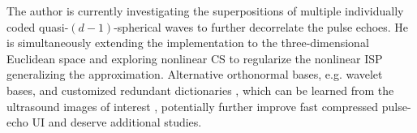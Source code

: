 The author is currently investigating
the superpositions of
multiple individually coded quasi-$(d-1)$-spherical waves to further decorrelate
the pulse echoes.
He is simultaneously extending
the implementation to
the three-dimensional Euclidean space and exploring
nonlinear \ac{CS} to regularize
the nonlinear \ac{ISP} generalizing
the  approximation.
Alternative orthonormal bases, e.g.
wavelet bases, and
customized redundant dictionaries
\cite{article:CandesACHA2011}, which can be learned from
the ultrasound images of
interest
\cite{article:LorintiuITMI2015}, potentially further improve
fast compressed pulse-echo \ac{UI} and deserve
additional studies.
